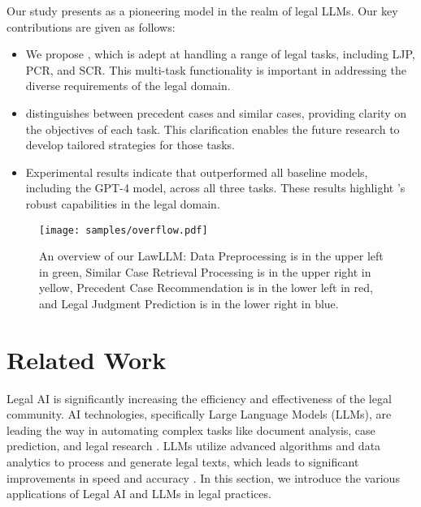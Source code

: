 Our study presents \sysname as a pioneering model in the realm of legal LLMs. Our key contributions are given as follows:
\begin{itemize}
    \item We propose \sysname, which is adept at handling a range of legal tasks, including LJP, PCR, and SCR. This multi-task functionality is important in addressing the diverse requirements of the legal domain.
        
    
    \item \sysname distinguishes between precedent cases and similar cases, providing clarity on the objectives of each task. This clarification enables the future research to develop tailored strategies for those tasks.

    \item Experimental results indicate that \sysname outperformed all baseline models, including the GPT-4 model, across all three tasks. These results highlight \sysname's robust capabilities in the legal domain. 

\end{itemize}

\begin{figure*}
  \texttt{[image: samples/overflow.pdf]}
  \caption{An overview of our LawLLM: Data Preprocessing is in the upper left in \textcolor{customgreen}{green}, Similar Case Retrieval Processing is in the upper right in \textcolor{customyellow}{yellow}, Precedent Case Recommendation is in the lower left in \textcolor{customred}{red}, and Legal Judgment Prediction is in the lower right in \textcolor{customblue}{blue}.}
  \label{fig:overflow}
\end{figure*}

\section{Related Work}

Legal AI is significantly increasing the efficiency and effectiveness of the legal community. AI technologies, specifically Large Language Models (LLMs), are leading the way in automating complex tasks like document analysis, case prediction, and legal research \cite{zhong2020does, wu-etal-2023-precedent}. LLMs utilize advanced algorithms and data analytics to process and generate legal texts, which leads to significant improvements in speed and accuracy \cite{zhou2023boosting}. In this section, we introduce the various applications of Legal AI and LLMs in legal practices.

